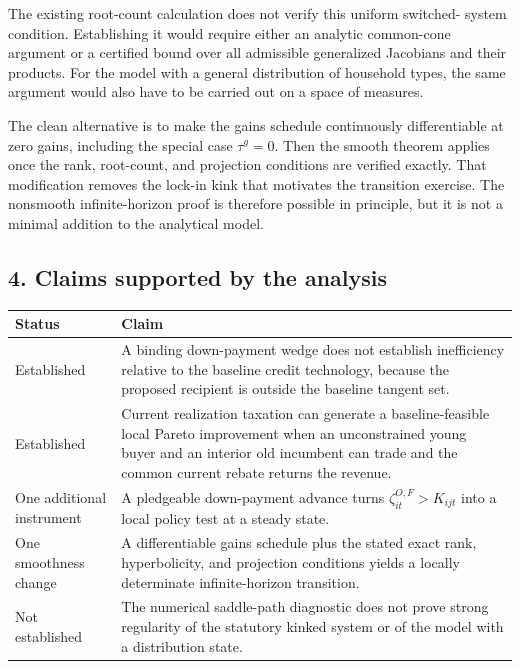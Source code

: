\documentclass[11pt]{article}
\begin{document}
The existing root-count calculation does not verify this uniform switched-
system condition.  Establishing it would require either an analytic common-cone
argument or a certified bound over all admissible generalized Jacobians and
their products.  For the model with a general distribution of household types,
the same argument would also have to be carried out on a space of measures.

The clean alternative is to make the gains schedule continuously
differentiable at zero gains, including the special case $\tau^g=0$.  Then the
smooth theorem applies once the rank, root-count, and projection conditions are
verified exactly.  That modification removes the lock-in kink that motivates
the transition exercise.  The nonsmooth infinite-horizon proof is therefore
possible in principle, but it is not a minimal addition to the analytical
model.

\subsection*{4. Claims supported by the analysis}

\begin{center}
\small
\begin{tabularx}{\textwidth}{@{}p{}X@{}}
\toprule
Status & Claim\\
\midrule
Established & A binding down-payment wedge does not establish inefficiency
relative to the baseline credit technology, because the proposed recipient is
outside the baseline tangent set.\\
Established & Current realization taxation can generate a baseline-feasible
local Pareto improvement when an unconstrained young buyer and an interior old
incumbent can trade and the common current rebate returns the revenue.\\
One additional instrument & A pledgeable down-payment advance turns
$\zeta_{it}^{O,F}>K_{ijt}$ into a local policy test at a steady state.\\
One smoothness change & A differentiable gains schedule plus the stated exact
rank, hyperbolicity, and projection conditions yields a locally determinate
infinite-horizon transition.\\
Not established & The numerical saddle-path diagnostic does not prove strong
regularity of the statutory kinked system or of the model with a distribution
state.\\
\bottomrule
\end{tabularx}
\end{center}
\end{document}
